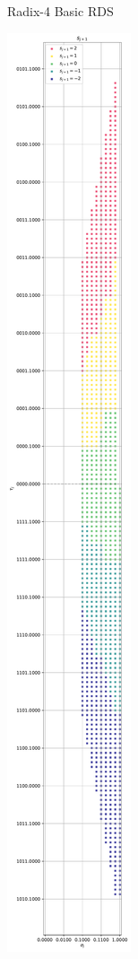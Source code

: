 \documentclass{article}
\begin{document}
\begin{figure}[htbp]
\begin{subfigure}[b]{0.32\textwidth}
    \caption{Radix-4 Basic RDS}
    \label{fig:sqrt:radix4_basic}
  \end{subfigure}
  \hfill
  \begin{subfigure}[b]{0.32\textwidth}
    \centering
    \includegraphics[width=\textwidth, height=3.5\textwidth, keepaspectratio=true]{../figures/square_root/radix4_rds_optimized_quadrants_1_4.pdf}

\end{subfigure}
\end{figure}
\end{document}

